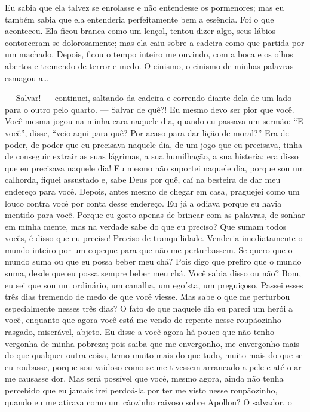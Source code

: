 Eu sabia que ela talvez se enrolasse e não entendesse os pormenores; mas
eu também sabia que ela entenderia perfeitamente bem a essência. Foi o
que aconteceu. Ela ficou branca como um lençol, tentou dizer algo, seus
lábios contorceram-se dolorosamente; mas ela caiu sobre a cadeira como
que partida por um machado. Depois, ficou o tempo inteiro me ouvindo,
com a boca e os olhos abertos e tremendo de terror e medo. O cinismo, o
cinismo de minhas palavras esmagou-a\ldots{}

--- Salvar! --- continuei, saltando da cadeira e correndo diante dela de um
lado para o outro pelo quarto. --- Salvar de quê?! Eu mesmo devo ser pior
que você. Você mesma jogou na minha cara naquele dia, quando eu passava
um sermão: “E você”, disse, “veio aqui para quê? Por acaso para dar
lição de moral?” Era de poder, de poder que eu precisava naquele dia,
de um jogo que eu precisava, tinha de conseguir extrair as suas
lágrimas, a sua humilhação, a sua histeria: era disso que eu precisava
naquele dia! Eu mesmo não suportei naquele dia, porque sou um calhorda,
fiquei assustado e, sabe Deus por quê, caí na besteira de dar meu endereço
para você. Depois, antes mesmo de chegar em casa, praguejei como um
louco contra você por conta desse endereço. Eu já a odiava porque eu
havia mentido para você. Porque eu gosto apenas de brincar com as
palavras, de sonhar em minha mente, mas na verdade sabe do que eu
preciso? Que sumam todos vocês, é disso que eu preciso! Preciso de
tranquilidade. Venderia imediatamente o mundo inteiro por um copeque
para que não me perturbassem. Se quero que o mundo suma ou que eu
possa beber meu chá? Pois digo que prefiro que o mundo suma, desde
que eu possa sempre beber meu chá. Você sabia disso ou não? Bom, eu sei
que sou um ordinário, um canalha, um egoísta, um preguiçoso. Passei
esses três dias tremendo de medo de que você viesse. Mas sabe o que me
perturbou especialmente nesses três dias? O fato de que naquele dia eu
pareci um herói a você, enquanto que agora você está me vendo de
repente nesse roupãozinho rasgado, miserável, abjeto. Eu disse a você
agora há pouco que não tenho vergonha de minha pobreza; pois saiba que
me envergonho, me envergonho mais do que qualquer outra coisa, temo
muito mais do que tudo, muito mais do que se eu roubasse, porque sou
vaidoso como se me tivessem arrancado a pele e até o ar me causasse
dor. Mas será possível que você, mesmo agora, ainda não tenha percebido
que eu jamais irei perdoá-la por ter me visto nesse roupãozinho, quando
eu me atirava como um cãozinho raivoso sobre Apollon? O salvador, o
